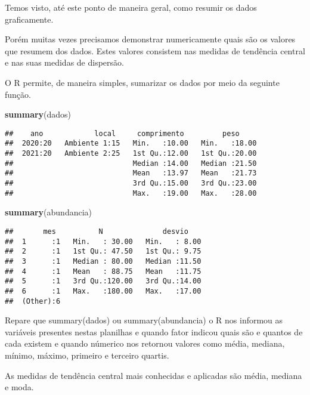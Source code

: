 \documentclass[]{book}
\newenvironment{Shaded}{\begin{snugshade}}{\end{snugshade}}
\newcommand{\KeywordTok}[1]{\textcolor[rgb]{0.13,0.29,0.53}{\textbf{#1}}}
\newcommand{\NormalTok}[1]{#1}
\begin{document}
Temos visto, até este ponto de maneira geral, como resumir os dados graficamente.

Porém muitas vezes precisamos demonstrar numericamente quais são os valores que resumem dos dados. Estes valores consistem nas medidas de tendência central e nas suas medidas de dispersão.

O R permite, de maneira simples, sumarizar os dados por meio da seguinte função.

\begin{Shaded}
\begin{Highlighting}[]
\KeywordTok{summary}\NormalTok{(dados)}
\end{Highlighting}
\end{Shaded}

\begin{verbatim}
##    ano            local     comprimento         peso      
##  2020:20   Ambiente 1:15   Min.   :10.00   Min.   :18.00  
##  2021:20   Ambiente 2:25   1st Qu.:12.00   1st Qu.:20.00  
##                            Median :14.00   Median :21.50  
##                            Mean   :13.97   Mean   :21.73  
##                            3rd Qu.:15.00   3rd Qu.:23.00  
##                            Max.   :19.00   Max.   :28.00
\end{verbatim}

\begin{Shaded}
\begin{Highlighting}[]
\KeywordTok{summary}\NormalTok{(abundancia)}
\end{Highlighting}
\end{Shaded}

\begin{verbatim}
##       mes          N              desvio     
##  1      :1   Min.   : 30.00   Min.   : 8.00  
##  2      :1   1st Qu.: 47.50   1st Qu.: 9.75  
##  3      :1   Median : 80.00   Median :11.50  
##  4      :1   Mean   : 88.75   Mean   :11.75  
##  5      :1   3rd Qu.:120.00   3rd Qu.:14.00  
##  6      :1   Max.   :180.00   Max.   :17.00  
##  (Other):6
\end{verbatim}

Repare que summary(dados) ou summary(abundancia) o R nos informou as variáveis presentes nestas planilhas e quando fator indicou quais são e quantos de cada existem e quando númerico nos retornou valores como média, mediana, mínimo, máximo, primeiro e terceiro quartis.

As medidas de tendência central mais conhecidas e aplicadas são média, mediana e moda.
\end{document}
